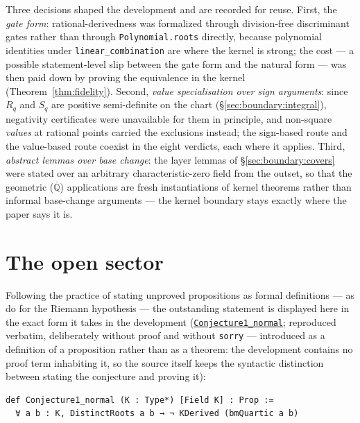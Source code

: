 \documentclass[11pt]{amsart}
\newcommand{\Q}{\mathbb{Q}}
\newcommand{\repourl}{https://github.com/hirokifukui/rd-quartics-classification}
\newcommand{\repotag}{v1.1.0}
\newcommand{\leanline}[3]{\href{\repourl/blob/\repotag/#1\#L#2}{\texttt{#3}}}
\begin{document}
Three decisions shaped the development and are recorded for reuse.
First, the \emph{gate form}: rational-derivedness was formalized
through division-free discriminant gates rather than through
\texttt{Polynomial.roots} directly, because polynomial identities under
\texttt{linear\_combination} are where the kernel is strong; the cost
--- a possible statement-level slip between the gate form and the
natural form --- was then paid down by proving the equivalence in the
kernel (Theorem~\ref{thm:fidelity}).  Second, \emph{value
specialisation over sign arguments}: since $R_q$ and $S_q$ are positive
semi-definite on the chart (\S\ref{sec:boundary:integral}), negativity
certificates were unavailable for them in principle, and non-square
\emph{values} at rational points carried the exclusions instead; the
sign-based route and the value-based route coexist in the eight
verdicts, each where it applies.  Third, \emph{abstract lemmas over
base change}: the layer lemmas of \S\ref{sec:boundary:covers} were
stated over an arbitrary characteristic-zero field from the outset, so
that the geometric ($\overline{\Q}$) applications are fresh
instantiations of kernel theorems rather than informal base-change
arguments --- the kernel boundary stays exactly where the paper says it
is.

\section{The open sector}\label{sec:open}

Following the practice of stating unproved propositions as formal
definitions --- as \cite{LoefflerStoll} do for the Riemann hypothesis
--- the outstanding statement is displayed here in the exact form it
takes in the development
(\leanline{Gap/BMThm7Transcript.lean}{996}{Conjecture1\_normal};
reproduced verbatim, deliberately without proof and without
\texttt{sorry} --- introduced as a definition of a proposition rather
than as a theorem: the development contains no proof term inhabiting
it, so the source itself keeps the syntactic distinction between
stating the conjecture and proving it):

\begin{lstlisting}
def Conjecture1_normal (K : Type*) [Field K] : Prop :=
  ∀ a b : K, DistinctRoots a b → ¬ KDerived (bmQuartic a b)
\end{lstlisting}
\end{document}
